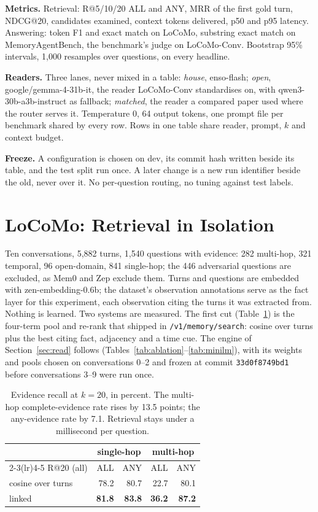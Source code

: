 \documentclass[11pt]{article}
\begin{document}
\textbf{Metrics.} Retrieval: R@5/10/20 ALL and ANY, MRR of the first gold
turn, NDCG@20, candidates examined, context tokens delivered, p50 and p95
latency. Answering: token F1 and exact match on LoCoMo, substring exact
match on MemoryAgentBench, the benchmark's judge on LoCoMo-Conv. Bootstrap
95\% intervals, 1,000 resamples over questions, on every headline.

\textbf{Readers.} Three lanes, never mixed in a table: \emph{house},
enso-flash; \emph{open}, google/gemma-4-31b-it, the reader LoCoMo-Conv
standardises on, with qwen3-30b-a3b-instruct as fallback;
\emph{matched}, the reader a compared paper used where the router serves
it. Temperature 0, 64 output tokens, one prompt file per benchmark shared by
every row. Rows in one table share reader, prompt, $k$ and context budget.

\textbf{Freeze.} A configuration is chosen on dev, its commit hash written
beside its table, and the test split run once. A later change is a new run
identifier beside the old, never over it. No per-question routing, no
tuning against test labels.

\section{LoCoMo: Retrieval in Isolation}
\label{sec:locomo}

Ten conversations, 5,882 turns, 1,540 questions with evidence: 282
multi-hop, 321 temporal, 96 open-domain, 841 single-hop; the 446 adversarial
questions are excluded, as Mem0 and Zep exclude them. Turns and questions are
embedded with zen-embedding-0.6b; the dataset's observation annotations serve
as the fact layer for this experiment, each observation citing the turns it
was extracted from. Nothing is learned. Two systems are measured. The first
cut (Table~\ref{tab:locomo}) is the four-term pool and re-rank that shipped
in \texttt{/v1/memory/search}: cosine over turns plus the best citing fact,
adjacency and a time cue. The engine of Section~\ref{sec:read} follows
(Tables~\ref{tab:ablation}--\ref{tab:minilm}), with its weights and pools
chosen on conversations 0--2 and frozen at commit \texttt{33d0f8749bd1}
before conversations 3--9 were run once.

\begin{table}[h]
\centering
\footnotesize
\begin{tabular}{lrrrr}
\toprule
 & \multicolumn{2}{c}{single-hop} & \multicolumn{2}{c}{multi-hop} \\
\cmidrule(lr){2-3}\cmidrule(lr){4-5}
R@20 (all) & ALL & ANY & ALL & ANY \\
\midrule
cosine over turns & 78.2 & 80.7 & 22.7 & 80.1 \\
linked & \textbf{81.8} & \textbf{83.8} & \textbf{36.2} & \textbf{87.2} \\
\bottomrule
\end{tabular}
\caption{Evidence recall at $k=20$, in percent. The multi-hop
complete-evidence rate rises by 13.5 points; the any-evidence rate by 7.1.
Retrieval stays under a millisecond per question.}
\label{tab:locomo}
\end{table}
\end{document}
